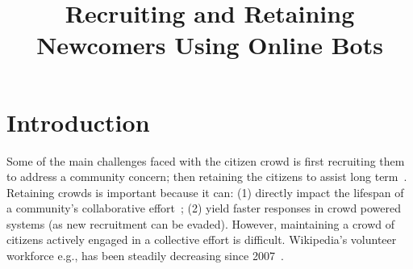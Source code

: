 \documentclass{sigchi}
\begin{document}
\title{Recruiting and Retaining Newcomers Using Online Bots}


\maketitle




\section{Introduction}
Some of the main challenges faced with the citizen crowd is first recruiting them to address a community concern; then retaining the citizens to assist long term~\cite{suh2009singularity}. Retaining crowds is important because it can: (1) directly impact the lifespan of a community's collaborative effort~\cite{halfaker2013making}; (2) yield faster responses in crowd powered systems (as new recruitment can be evaded). However, maintaining a crowd of citizens actively engaged in a collective effort is difficult. Wikipedia's volunteer workforce e.g., has been steadily decreasing since 2007~\cite{CHINOSAUR:venue}. 
\end{document}
